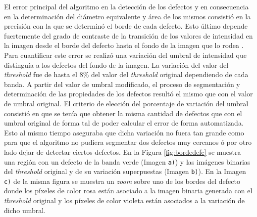 El error principal del algoritmo en la detección de los defectos y en consecuencia en la determinación del diámetro equivalente  y área de los mismos consistió en la precisión con la que se determinó el borde de cada defecto. Esto último depende fuertemente del grado de contraste de la transición de los valores de intensidad en la imagen desde el borde del defecto hasta el fondo de la imagen que lo rodea \cite{quentin}. Para cuantificar este error se realizó una variación del umbral de intensidad que distinguía a los defectos del fondo de la imagen. La variación del valor del \textit{threshold} fue de hasta el 8\% del valor del \textit{threshold} original dependiendo de cada banda. A partir del valor de umbral modificado, el proceso de segmentación y determinación de las propiedades de los defectos resultó el mismo que con el valor de umbral original. El criterio de elección del porcentaje de variación del umbral consistió en que se tenía que obtener la misma cantidad de defectos que con el umbral original de forma tal de poder calcular el error de forma automatizada. Esto al mismo tiempo aseguraba que dicha variación no fuera tan grande como para que el algoritmo no pudiera segmentar dos defectos muy cercanos ó por otro lado dejar de detectar ciertos defectos. En la Figura \ref{fig:bordedefe} se muestra una región con un defecto de la banda verde (Imagen \texttt{a)}) y las imágenes binarias del \textit{threshold} original y de su variación superpuestas (Imagen \texttt{b)}). En la Imagen \texttt{c)} de la misma figura se muestra un \textit{zoom} sobre uno de los bordes del defecto donde los píxeles de color rosa están asociado a la imagen binaria generada con el \textit{threshold} original y los píxeles de color violeta están asociados a la variación de dicho umbral.
